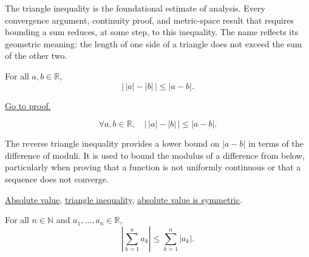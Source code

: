 \begin{remark*}[Interpretation]
The triangle inequality is the foundational estimate of analysis.  Every
convergence argument, continuity proof, and metric-space result that
requires bounding a sum reduces, at some step, to this inequality.  The
name reflects its geometric meaning: the length of one side of a triangle
does not exceed the sum of the other two.
\end{remark*}


\begin{theorem}
\label{thm:reverse-triangle-inequality}
For all $a, b \in \mathbb{R}$,
\[
  \lvert\, \lvert a \rvert - \lvert b \rvert \,\rvert
  \le \lvert a - b \rvert.
\]
\end{theorem}



\begin{remark*}[Proof]
\hyperref[prf:reverse-triangle-inequality]{Go to proof.}
\end{remark*}

\begin{remark*}
\[
  \forall a, b \in \mathbb{R},\quad
  \lvert\, \lvert a \rvert - \lvert b \rvert \,\rvert
  \le \lvert a - b \rvert.
\]
\end{remark*}

\begin{remark*}[Interpretation]
The reverse triangle inequality provides a lower bound on $\lvert a - b
\rvert$ in terms of the difference of moduli.  It is used to bound the
modulus of a difference from below, particularly when proving that a
function is not uniformly continuous or that a sequence does not converge.
\end{remark*}

\begin{dependencies}
\hyperref[def:absolute-value]{Absolute value},
\hyperref[thm:triangle-inequality]{triangle inequality},
\hyperref[thm:absolute-value-symmetric]{absolute value is symmetric}.
\end{dependencies}


\begin{theorem}
\label{thm:absolute-value-sum-bound}
For all $n \in \mathbb{N}$ and $a_1, \ldots, a_n \in \mathbb{R}$,
\[
  \left\lvert \sum_{k=1}^{n} a_k \right\rvert
  \le \sum_{k=1}^{n} \lvert a_k \rvert.
\]
\end{theorem}



